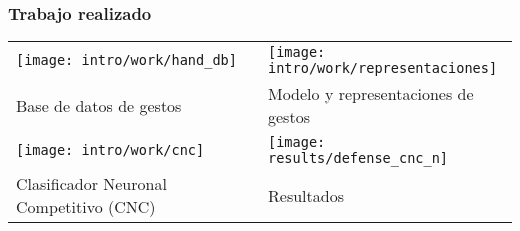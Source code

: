 \begin{frame}
\frametitle{Trabajo realizado}

\centering
\begin{tabular}{C{0.5\linewidth}C{0.5\linewidth}}
 \texttt{[image: intro/work/hand\_db]} & \texttt{[image: intro/work/representaciones]}\\
[-1.5ex] Base de datos de gestos  & Modelo y representaciones de gestos \\
\texttt{[image: intro/work/cnc]} & \texttt{[image: results/defense\_cnc\_n]} \\  
[-1.5ex] Clasificador Neuronal Competitivo (CNC) & Resultados
\end{tabular}

\end{frame}




